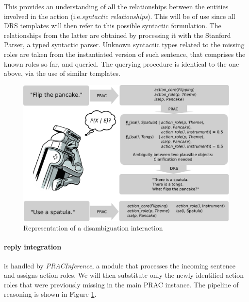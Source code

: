 \documentclass[oribibl]{llncs}
\begin{document}
This provides an understanding of all the relationships between 
the entities involved in the action (i.e.\textit{syntactic relationships}). 
This will be of use since all DRS templates will then refer to this 
possible syntactic formulation. The relationships from the latter 
are obtained by processing it with the Stanford Parser\cite
{mcdm08b}, a typed syntactic parser. Unknown syntactic types related 
to the missing roles are taken from the instantiated version of such 
sentence, that comprises the known roles so far, and queried. The 
querying procedure is identical to the one above, via the use of 
similar templates.
\begin{figure}[t]
\centering
\includegraphics[width=0.9\columnwidth]{results.pdf}
\caption{Representation of a disambiguation interaction}
\label{fig:pipeline}
\end{figure} 




\paragraph{reply integration} is handled by \textit{PRACInference}, 
a module that processes the incoming sentence and assigns action 
roles. We will then substitute only the newly identified action 
roles that were previously missing in the main PRAC instance. The pipeline
of reasoning is shown in Figure \ref{fig:pipeline}.
\end{document}
